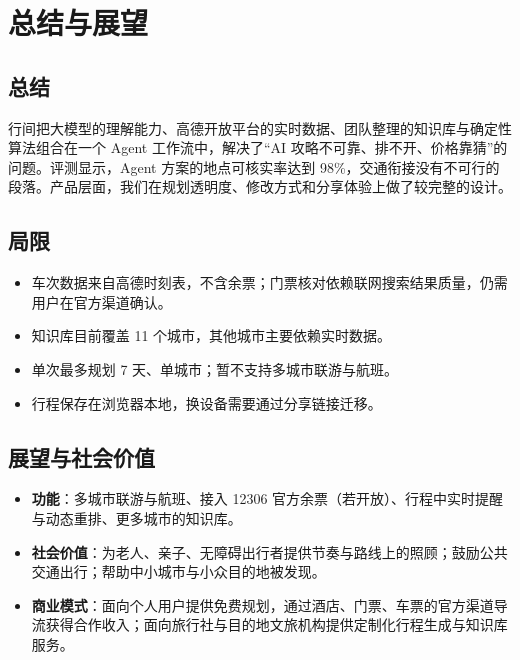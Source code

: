 \documentclass[a4paper]{article}
\begin{document}
\section{总结与展望}

\subsection{总结}

行间把大模型的理解能力、高德开放平台的实时数据、团队整理的知识库与确定性算法组合在一个 Agent 工作流中，解决了``AI 攻略不可靠、排不开、价格靠猜''的问题。评测显示，Agent 方案的地点可核实率达到
98\%，交通衔接没有不可行的段落。产品层面，我们在规划透明度、修改方式和分享体验上做了较完整的设计。

\subsection{局限}

\begin{itemize}
\item
  车次数据来自高德时刻表，不含余票；门票核对依赖联网搜索结果质量，仍需用户在官方渠道确认。
\item
  知识库目前覆盖 11 个城市，其他城市主要依赖实时数据。
\item
  单次最多规划 7 天、单城市；暂不支持多城市联游与航班。
\item
  行程保存在浏览器本地，换设备需要通过分享链接迁移。
\end{itemize}

\subsection{展望与社会价值}

\begin{itemize}
\item
  \textbf{功能}：多城市联游与航班、接入 12306 官方余票（若开放）、行程中实时提醒与动态重排、更多城市的知识库。
\item
  \textbf{社会价值}：为老人、亲子、无障碍出行者提供节奏与路线上的照顾；鼓励公共交通出行；帮助中小城市与小众目的地被发现。
\item
  \textbf{商业模式}：面向个人用户提供免费规划，通过酒店、门票、车票的官方渠道导流获得合作收入；面向旅行社与目的地文旅机构提供定制化行程生成与知识库服务。
\end{itemize}
\end{document}
